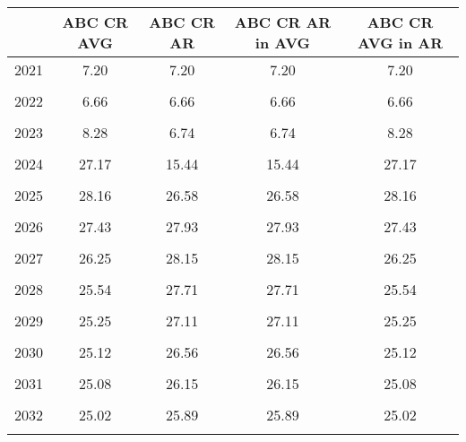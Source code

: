 \begin{tabular}{l*{4}{c}}
\hline\hline
                &ABC CR AVG&ABC CR AR&ABC CR AR in AVG&ABC CR AVG in AR\\
\hline
2021            &     7.20&     7.20&     7.20&     7.20\\
                &         &         &         &         \\
2022            &     6.66&     6.66&     6.66&     6.66\\
                &         &         &         &         \\
2023            &     8.28&     6.74&     6.74&     8.28\\
                &         &         &         &         \\
2024            &    27.17&    15.44&    15.44&    27.17\\
                &         &         &         &         \\
2025            &    28.16&    26.58&    26.58&    28.16\\
                &         &         &         &         \\
2026            &    27.43&    27.93&    27.93&    27.43\\
                &         &         &         &         \\
2027            &    26.25&    28.15&    28.15&    26.25\\
                &         &         &         &         \\
2028            &    25.54&    27.71&    27.71&    25.54\\
                &         &         &         &         \\
2029            &    25.25&    27.11&    27.11&    25.25\\
                &         &         &         &         \\
2030            &    25.12&    26.56&    26.56&    25.12\\
                &         &         &         &         \\
2031            &    25.08&    26.15&    26.15&    25.08\\
                &         &         &         &         \\
2032            &    25.02&    25.89&    25.89&    25.02\\
                &         &         &         &         \\
\hline\hline
\end{tabular}
